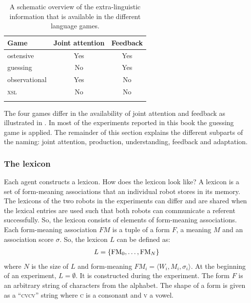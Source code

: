 \begin{table}
\centering
\begin{tabular}{lcc}
\lsptoprule
Game & Joint attention & Feedback\\
\midrule
ostensive & Yes & Yes\\
guessing & No & Yes\\
observational & Yes & No\\
{\scshape xsl} & No & No\\
\lspbottomrule
\end{tabular}
\caption{A schematic overview of the extra-linguistic information that is available in the different language games.}
\label{t:cm:games}
\end{table}


The four games differ in the availability of joint attention and feedback as illustrated in . In most of the experiments reported in this book the guessing game is applied. The remainder of this section explains the different subparts of the naming: joint attention, production, understanding, feedback and adaptation.

\subsubsection{The lexicon}

Each agent constructs a lexicon. How does the lexicon look like? A lexicon is a set of form-meaning associations that an individual robot stores in its memory. The lexicons of the two robots in the experiments can differ and are shared when the lexical entries are used such that both robots can communicate a referent successfully. So, the lexicon consists of elements of form-meaning associations. Each form-meaning association $FM$ is a tuple of a form $F$, a meaning $M$ and an association score $\sigma$. So, the lexicon $L$ can be defined as:
\begin{eqnarray}
L=\{{\bf \mbox{FM}}_0, \ldots, {\bf \mbox{FM}}_N\}
\end{eqnarray}
\noindent
where $N$ is the size of $L$ and form-meaning ${FM}_i=\langle W_i,M_i,\sigma_i\rangle$. At the beginning of an experiment, $L=\emptyset$. It is constructed during the experiment. The form $F$ is an arbitrary string of characters from the alphabet. The shape of a form is given as a ``{\scshape cvcv}'' string where {\scshape c} is a consonant and {\scshape v} a vowel.

